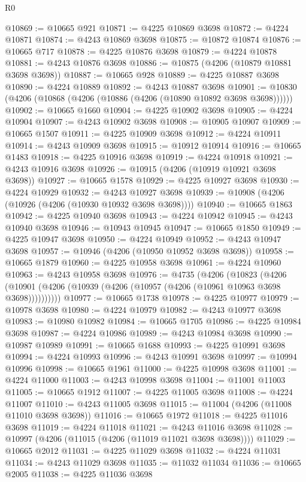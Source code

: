 \begin{lexlean}{R0}
\begin{coremodule}
@10869 := @10665 @921
@10871 := @4225 @10869 @3698
@10872 := @4224 @10871
@10874 := @4243 @10869 @3698
@10875 := @10872 @10874
@10876 := @10665 @717
@10878 := @4225 @10876 @3698
@10879 := @4224 @10878
@10881 := @4243 @10876 @3698
@10886 := @10875 (@4206 (@10879 @10881 @3698 @3698))
@10887 := @10665 @928
@10889 := @4225 @10887 @3698
@10890 := @4224 @10889
@10892 := @4243 @10887 @3698
@10901 := @10830 (@4206 (@10868 (@4206 (@10886 (@4206 (@10890 @10892 @3698 @3698))))))
@10902 := @10665 @1660
@10904 := @4225 @10902 @3698
@10905 := @4224 @10904
@10907 := @4243 @10902 @3698
@10908 := @10905 @10907
@10909 := @10665 @1507
@10911 := @4225 @10909 @3698
@10912 := @4224 @10911
@10914 := @4243 @10909 @3698
@10915 := @10912 @10914
@10916 := @10665 @1483
@10918 := @4225 @10916 @3698
@10919 := @4224 @10918
@10921 := @4243 @10916 @3698
@10926 := @10915 (@4206 (@10919 @10921 @3698 @3698))
@10927 := @10665 @1578
@10929 := @4225 @10927 @3698
@10930 := @4224 @10929
@10932 := @4243 @10927 @3698
@10939 := @10908 (@4206 (@10926 (@4206 (@10930 @10932 @3698 @3698))))
@10940 := @10665 @1863
@10942 := @4225 @10940 @3698
@10943 := @4224 @10942
@10945 := @4243 @10940 @3698
@10946 := @10943 @10945
@10947 := @10665 @1850
@10949 := @4225 @10947 @3698
@10950 := @4224 @10949
@10952 := @4243 @10947 @3698
@10957 := @10946 (@4206 (@10950 @10952 @3698 @3698))
@10958 := @10665 @1879
@10960 := @4225 @10958 @3698
@10961 := @4224 @10960
@10963 := @4243 @10958 @3698
@10976 := @4735
    (@4206
      (@10823
        (@4206 (@10901 (@4206 (@10939 (@4206 (@10957 (@4206 (@10961 @10963 @3698 @3698))))))))))
@10977 := @10665 @1738
@10978 := @4225 @10977
@10979 := @10978 @3698
@10980 := @4224 @10979
@10982 := @4243 @10977 @3698
@10983 := @10980 @10982
@10984 := @10665 @1705
@10986 := @4225 @10984 @3698
@10987 := @4224 @10986
@10989 := @4243 @10984 @3698
@10990 := @10987 @10989
@10991 := @10665 @1688
@10993 := @4225 @10991 @3698
@10994 := @4224 @10993
@10996 := @4243 @10991 @3698
@10997 := @10994 @10996
@10998 := @10665 @1961
@11000 := @4225 @10998 @3698
@11001 := @4224 @11000
@11003 := @4243 @10998 @3698
@11004 := @11001 @11003
@11005 := @10665 @1912
@11007 := @4225 @11005 @3698
@11008 := @4224 @11007
@11010 := @4243 @11005 @3698
@11015 := @11004 (@4206 (@11008 @11010 @3698 @3698))
@11016 := @10665 @1972
@11018 := @4225 @11016 @3698
@11019 := @4224 @11018
@11021 := @4243 @11016 @3698
@11028 := @10997 (@4206 (@11015 (@4206 (@11019 @11021 @3698 @3698))))
@11029 := @10665 @2012
@11031 := @4225 @11029 @3698
@11032 := @4224 @11031
@11034 := @4243 @11029 @3698
@11035 := @11032 @11034
@11036 := @10665 @2005
@11038 := @4225 @11036 @3698

\end{coremodule}
\end{lexlean}
